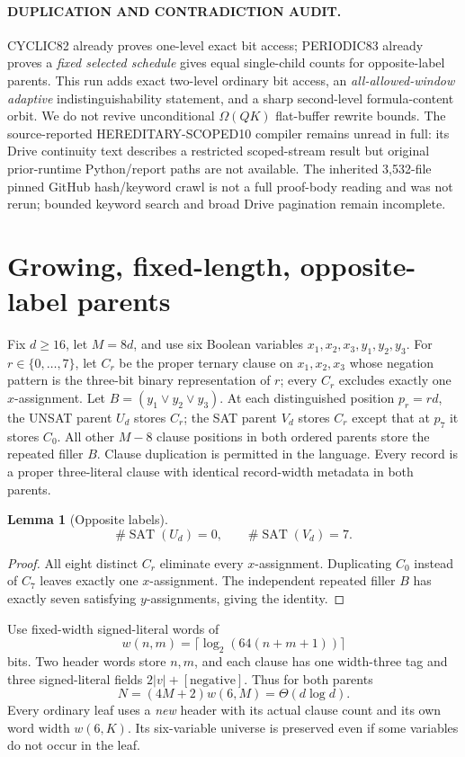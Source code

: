 \documentclass[11pt]{article}
\newtheorem{lemma}[theorem]{Lemma}
\begin{document}
\paragraph{DUPLICATION AND CONTRADICTION AUDIT.}
CYCLIC82 already proves one-level exact bit access; PERIODIC83 already proves a \emph{fixed selected schedule} gives equal single-child counts for opposite-label parents. This run adds exact two-level ordinary bit access, an \emph{all-allowed-window adaptive} indistinguishability statement, and a sharp second-level formula-content orbit. We do not revive unconditional \(\Omega(QK)\) flat-buffer rewrite bounds. The source-reported HEREDITARY-SCOPED10 compiler remains unread in full: its Drive continuity text describes a restricted scoped-stream result but original prior-runtime Python/report paths are not available. The inherited 3,532-file pinned GitHub hash/keyword crawl is not a full proof-body reading and was not rerun; bounded keyword search and broad Drive pagination remain incomplete.

\section{Growing, fixed-length, opposite-label parents}
Fix \(d\ge16\), let \(M=8d\), and use six Boolean variables \(x_1,x_2,x_3,y_1,y_2,y_3\). For \(r\in\{0,\ldots,7\}\), let \(C_r\) be the proper ternary clause on \(x_1,x_2,x_3\) whose negation pattern is the three-bit binary representation of \(r\); every \(C_r\) excludes exactly one \(x\)-assignment. Let \(B=(y_1\vee y_2\vee y_3)\). At each distinguished position \(p_r=rd\), the UNSAT parent \(U_d\) stores \(C_r\); the SAT parent \(V_d\) stores \(C_r\) except that at \(p_7\) it stores \(C_0\). All other \(M-8\) clause positions in both ordered parents store the repeated filler \(B\). Clause duplication is permitted in the language. Every record is a proper three-literal clause with identical record-width metadata in both parents.

\begin{lemma}[Opposite labels]\label{lem:parents}
\[
\#\operatorname{SAT}(U_d)=0,\qquad \#\operatorname{SAT}(V_d)=7.
\]
\end{lemma}
\begin{proof}
All eight distinct \(C_r\) eliminate every \(x\)-assignment. Duplicating \(C_0\) instead of \(C_7\) leaves exactly one \(x\)-assignment. The independent repeated filler \(B\) has exactly seven satisfying \(y\)-assignments, giving the identity.
\end{proof}
Use fixed-width signed-literal words of
\[
w(n,m)=\lceil\log_2(64(n+m+1))\rceil
\]
bits. Two header words store \(n,m\), and each clause has one width-three tag and three signed-literal fields \(2|v|+[\text{negative}]\). Thus for both parents
\[
N=(4M+2)w(6,M)=\Theta(d\log d).
\]
Every ordinary leaf uses a \emph{new} header with its actual clause count and its own word width \(w(6,K)\). Its six-variable universe is preserved even if some variables do not occur in the leaf.
\end{document}
